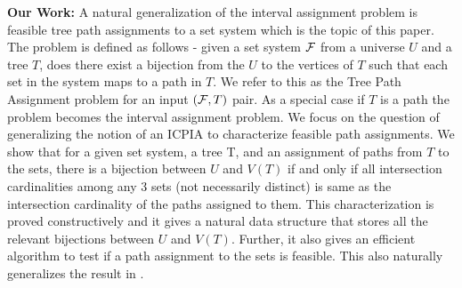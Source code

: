 \documentclass{llncs}
\def\cF{{\cal F}}
\begin{document}
\noindent
{\bf Our Work:}
A natural generalization of the interval assignment problem is
feasible tree path assignments to a set system which is the topic of
this paper. The problem is defined as follows - given a set system
$\cF$ from a universe $U$ and a tree $T$, does there exist a bijection
from the $U$ to the vertices of $T$ such that each set in the system
maps to a path in $T$.  We refer to this as the Tree Path Assignment
problem for an input $(\cF,T)$ pair. As a special case if $T$ is a path
the problem becomes the interval assignment problem.  We focus on the
question of generalizing the notion of an ICPIA \cite{nsnrs09} to
characterize feasible path assignments.  We show that for a given set
system, a tree T, and an assignment of paths from $T$ to the sets,
there is a bijection between $U$ and $V(T)$ if and only if all
intersection cardinalities among any 3 sets (not necessarily distinct)
is same as the intersection cardinality of the paths assigned to them.
This characterization is proved constructively and it gives a natural
data structure that stores all the relevant bijections between $U$ and
$V(T)$.  Further, it also gives an efficient algorithm to test if a
path assignment to the sets is feasible.  This also naturally
generalizes the result in \cite{nsnrs09}.
 
\end{document}
